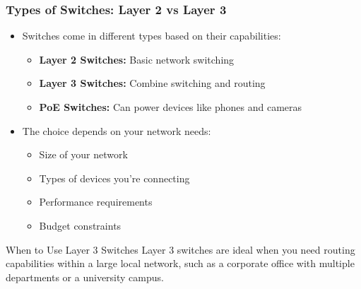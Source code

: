 \documentclass{beamer}
\begin{document}
\begin{frame}
    \frametitle{Types of Switches: Layer 2 vs Layer 3}
    
    \begin{itemize}
        \item Switches come in different types based on their capabilities:
        \begin{itemize}
            \item \textbf{Layer 2 Switches:} Basic network switching
            \item \textbf{Layer 3 Switches:} Combine switching and routing
            \item \textbf{PoE Switches:} Can power devices like phones and cameras
        \end{itemize}
        
        \item The choice depends on your network needs:
        \begin{itemize}
            \item Size of your network
            \item Types of devices you're connecting
            \item Performance requirements
            \item Budget constraints
        \end{itemize}
    \end{itemize}
    
    \begin{alertblock}{When to Use Layer 3 Switches}
        Layer 3 switches are ideal when you need routing capabilities within a large local network, such as a corporate office with multiple departments or a university campus.
    \end{alertblock}
\end{frame}
\end{document}

